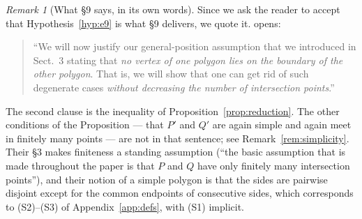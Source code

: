 \documentclass[11pt,a4paper]{article}
\theoremstyle{plain}
\theoremstyle{definition}
\theoremstyle{remark}
\newtheorem{remark}[theorem]{Remark}
\begin{document}
\begin{remark}[What \S9 says, in its own words]\label{rem:akrquote}
Since we ask the reader to accept that Hypothesis~\ref{hyp:e9} is what \S9
delivers, we quote it. \cite[\S9]{AckermanKeszeghRote2022} opens:

\begin{quote}
``We will now justify our general-position assumption that we introduced in
Sect.~3 stating that \emph{no vertex of one polygon lies on the boundary of the
other polygon}. That is, we will show that one can get rid of such degenerate
cases \emph{without decreasing the number of intersection points}.''
\end{quote}

\noindent
The second clause is the inequality of Proposition~\ref{prop:reduction}. The
other conditions of the Proposition --- that $P'$ and $Q'$ are again simple and
again meet in finitely many points --- are not in that sentence; see
Remark~\ref{rem:simplicity}. Their \S3 makes finiteness a standing assumption
(``the basic assumption that is made throughout the paper is that $P$ and $Q$
have only finitely many intersection points''), and their notion of a simple
polygon is that the sides are pairwise disjoint except for the common
endpoints of consecutive sides, which corresponds to (S2)--(S3) of
Appendix~\ref{app:defs}, with (S1) implicit.
\end{remark}
\end{document}
